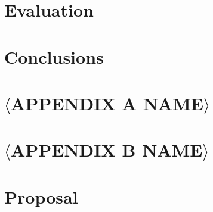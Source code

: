 \documentclass[12pt,a4paper,twoside,openright]{report}
\begin{document}
\chapter{Evaluation}


\chapter{Conclusions}



\newpage

\printbibliography


\appendix


\chapter{\(\langle\)APPENDIX A NAME\(\rangle\)}



\newpage

\chapter{\(\langle\)APPENDIX B NAME\(\rangle\)}



\newpage

\chapter{Proposal}



\end{document}

